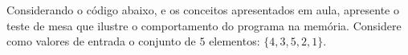 
Considerando o código abaixo, e os conceitos apresentados em aula,
apresente o teste de mesa que ilustre o comportamento do programa na memória.
Considere como valores de entrada o conjunto de $5$ elementos: $\{4, 3, 5, 2, 1\}$.



